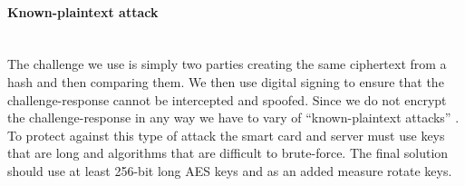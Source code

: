 \paragraph{Known-plaintext attack}\mbox{}\\
The challenge we use is simply two parties creating the same ciphertext from a hash and then comparing them. We then use digital signing to ensure that the challenge-response cannot be intercepted and spoofed. Since we do not encrypt the challenge-response in any way we have to vary of ``known-plaintext attacks'' \cite[~Ch. 2.3.2]{cryptoMath}. To protect against this type of attack the smart card and server must use keys that are long and algorithms that are difficult to brute-force. The final solution should use at least 256-bit long AES keys and as an added measure rotate keys.






